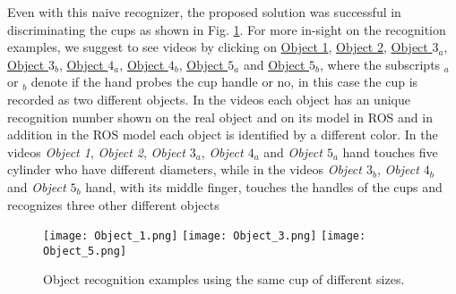 Even with this naive recognizer, the proposed solution was successful in discriminating the cups as shown in Fig. \ref{fig:Object_1}. For more in-sight on the recognition examples, we suggest to see videos by clicking on \href{https://www.youtube.com/watch?v=d_WPQ3WmHRg}{Object 1}, \href{https://www.youtube.com/watch?v=PG38VObdl6o}{Object 2}, \href{https://www.youtube.com/watch?v=bIYhLXm90hc}{Object $3_a$}, \href{https://www.youtube.com/watch?v=IXVlBAoGKho}{Object $3_b$}, \href{https://www.youtube.com/watch?v=Efmm6-JHcxU}{Object $4_a$}, \href{https://www.youtube.com/watch?v=NZElSV_AnJ4}{Object $4_b$}, \href{https://www.youtube.com/watch?v=mDDb5oTaHzM}{Object $5_a$} and \href{https://www.youtube.com/watch?v=sLzU39zffFY}{Object $5_b$}, where the subscripts $_a$ or $_b$ denote if the hand probes the cup handle or no, in this case the cup is recorded as two different objects.
In the videos each object has an unique recognition number shown on the real object and on its model in ROS and in addition in the ROS model each object is identified by a different color. In the videos \textit{Object 1}, \textit{Object 2}, \textit{Object $3_a$}, \textit{Object $4_a$} and \textit{Object $5_a$} hand touches five cylinder who have different diameters, while in the videos \textit{Object $3_b$}, \textit{Object $4_b$} and \textit{Object $5_b$} hand, with its middle finger, touches the handles of the cups and recognizes three other different objects    

\begin{figure}[h]
\centering
\texttt{[image: Object\_1.png]}
\texttt{[image: Object\_3.png]}
\texttt{[image: Object\_5.png]}
\caption{Object recognition examples using the same cup of different sizes.}
\label{fig:Object_1}
\end{figure}